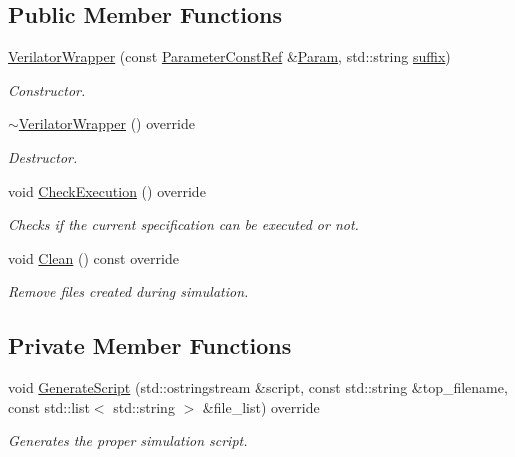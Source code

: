 \subsection*{Public Member Functions}
\begin{DoxyCompactItemize}
\item 
\hyperlink{classVerilatorWrapper_ac1530972022e23dda9782f17a512b310}{Verilator\+Wrapper} (const \hyperlink{Parameter_8hpp_a37841774a6fcb479b597fdf8955eb4ea}{Parameter\+Const\+Ref} \&\hyperlink{classSimulationTool_adc409fd8f18901e2d0ea4a6ab6690138}{Param}, std\+::string \hyperlink{classVerilatorWrapper_af3697ee97f7a93c117e04695a0aa6e70}{suffix})
\begin{DoxyCompactList}\small\item\em Constructor. \end{DoxyCompactList}\item 
\hyperlink{classVerilatorWrapper_a0b67c3978509743ceee226ea10a9fcdd}{$\sim$\+Verilator\+Wrapper} () override
\begin{DoxyCompactList}\small\item\em Destructor. \end{DoxyCompactList}\item 
void \hyperlink{classVerilatorWrapper_ade8f594c94962542008b87f5b0beff70}{Check\+Execution} () override
\begin{DoxyCompactList}\small\item\em Checks if the current specification can be executed or not. \end{DoxyCompactList}\item 
void \hyperlink{classVerilatorWrapper_adfffb92b6facd27a89a6e6999b671ea6}{Clean} () const override
\begin{DoxyCompactList}\small\item\em Remove files created during simulation. \end{DoxyCompactList}\end{DoxyCompactItemize}
\subsection*{Private Member Functions}
\begin{DoxyCompactItemize}
\item 
void \hyperlink{classVerilatorWrapper_a4f67b56da53843f72ba663dfee9a2b5a}{Generate\+Script} (std\+::ostringstream \&script, const std\+::string \&top\+\_\+filename, const std\+::list$<$ std\+::string $>$ \&file\+\_\+list) override
\begin{DoxyCompactList}\small\item\em Generates the proper simulation script. \end{DoxyCompactList}\end{DoxyCompactItemize}
